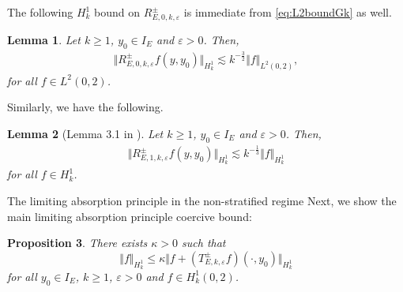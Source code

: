 \documentclass[11pt,reqno]{amsproc}
\makeatletter
\renewcommand\subsection{\@startsection{subsection}{2}%
\normalparindent{.5\linespacing\@plus.7\linespacing}{-.5em}
{\normalfont\bfseries}}
\newtheorem{proposition}{Proposition}[section]
\newtheorem{lemma}[proposition]{Lemma}
\theoremstyle{definition}
\numberwithin{equation}{section}
\newcommand{\ep}{\varepsilon}
\makeatother
\begin{document}
The following $H_k^1$ bound on $R_{E,0,k,\ep}^\pm$ is immediate from \eqref{eq:L2boundGk} as well.
\begin{lemma}\label{lemma:RE0mapsL2toH1k}
Let $k\geq 1$, $y_0\in I_E$ and $\ep>0$. Then,
\begin{align*}
\Vert R_{E,0,k,\ep}^\pm f(y,y_0) \Vert_{H_k^1} \lesssim k^{-\frac32}\Vert f \Vert_{L^2(0,2)},
\end{align*}
for all $f\in L^2(0,2)$.
\end{lemma}

Similarly, we have the following.

\begin{lemma}[Lemma 3.1 in \cite{JiaGev20}]\label{lemma:RE1mapsH1ktoH1k}
Let $k\geq 1$, $y_0\in I_E$ and $\ep>0$. Then,
\begin{align*}
\Vert R_{E,1,k,\ep}^\pm f(y,y_0) \Vert_{H_k^1} \lesssim k^{-\frac13}\Vert f \Vert_{H_k^1}
\end{align*}
for all $f\in H_k^1$.
\end{lemma}


\subsection{The limiting absorption principle in the non-stratified regime}
Next, we show the main limiting absorption principle coercive bound:

\begin{proposition}\label{prop:LAPHk1}
There exists $\kappa>0$ such that 
\begin{equation}
\Vert f\Vert_{H^1_k} \leq \kappa \Vert f + (T_{E,k,\ep}^\pm f)(\cdot,y_0)\Vert_{H^1_k}
\end{equation}
for all $y_0\in I_E$, $k\geq 1$, $\ep>0$ and $f\in H_k^1(0,2)$.
\end{proposition}
\end{document}
